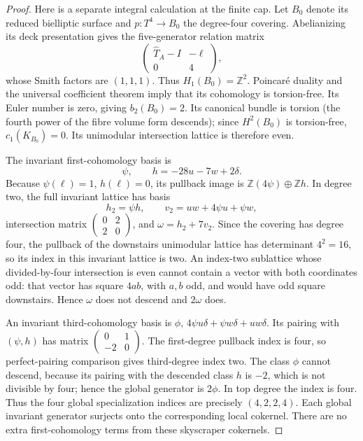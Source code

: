 \begin{proof}
Here is a separate integral calculation at the finite cap. Let \(B_0\) denote its reduced bielliptic surface and \(p:T^4\to B_0\) the degree-four covering. Abelianizing its deck presentation gives the five-generator relation matrix \[
 \begin{pmatrix}\widehat T_A-I&-\ell\\0&4\end{pmatrix},
\] whose Smith factors are \((1,1,1)\). Thus \(H_1(B_0)=\mathbb Z^2\). Poincaré duality and the universal coefficient theorem imply that its cohomology is torsion-free. Its Euler number is zero, giving \(b_2(B_0)=2\). Its canonical bundle is torsion (the fourth power of the fibre volume form descends); since \(H^2(B_0)\) is torsion-free, \(c_1(K_{B_0})=0\). Its unimodular intersection lattice is therefore even.

The invariant first-cohomology basis is \[
 \psi,\qquad h=-28u-7w+2\delta.
\] Because \(\psi(\ell)=1\), \(h(\ell)=0\), its pullback image is \(\mathbb Z(4\psi)\oplus\mathbb Zh\). In degree two, the full invariant lattice has basis \[
 h_2=\psi h,\qquad v_2=uw+4\psi u+\psi w,
\] intersection matrix \(\left(\begin{smallmatrix}0&2\\2&0\end{smallmatrix}\right)\), and \(\omega=h_2+7v_2\). Since the covering has degree four, the pullback of the downstairs unimodular lattice has determinant \(4^2=16\), so its index in this invariant lattice is two. An index-two sublattice whose divided-by-four intersection is even cannot contain a vector with both coordinates odd: that vector has square \(4ab\), with \(a,b\) odd, and would have odd square downstairs. Hence \(\omega\) does not descend and \(2\omega\) does.

An invariant third-cohomology basis is \(\phi,\,4\psi u\delta+\psi w\delta+uw\delta\). Its pairing with \((\psi,h)\) has matrix \(\left(\begin{smallmatrix}0&1\\-2&0\end{smallmatrix}\right)\). The first-degree pullback index is four, so perfect-pairing comparison gives third-degree index two. The class \(\phi\) cannot descend, because its pairing with the descended class \(h\) is \(-2\), which is not divisible by four; hence the global generator is \(2\phi\). In top degree the index is four. Thus the four global specialization indices are precisely \((4,2,2,4)\). Each global invariant generator surjects onto the corresponding local cokernel. There are no extra first-cohomology terms from these skyscraper cokernels.


\end{proof}
